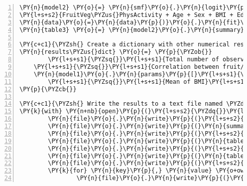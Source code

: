 \documentclass[11pt]{article}
\begin{document}
\begin{Verbatim}[commandchars=\\\{\},numbers=left,firstnumber=1,stepnumber=1,formatcom=\footnotesize]
\PY{n}{model2} \PY{o}{=} \PY{n}{smf}\PY{o}{.}\PY{n}{logit}\PY{p}{(}\PY{l+s+s2}{\PYZdq{}}\PY{l+s+s2}{Diabetes\PYZus{}binary \PYZti{} FruitVeg + PhysActivity + }\PY{l+s+se}{\PYZbs{}}
\PY{l+s+s2}{FruitVeg\PYZus{}PhysActivity + Age + Sex + BMI + Education + Income}\PY{l+s+s2}{\PYZdq{}}\PY{p}{,} \PYZbs{}
\PY{n}{data}\PY{o}{=}\PY{n}{data}\PY{p}{)}\PY{o}{.}\PY{n}{fit}\PY{p}{(}\PY{p}{)}
\PY{n}{table3} \PY{o}{=} \PY{n}{model2}\PY{o}{.}\PY{n}{summary}\PY{p}{(}\PY{p}{)}

\PY{c+c1}{\PYZsh{} Create a dictionary with other numerical results}
\PY{n}{results\PYZus{}dict} \PY{o}{=} \PY{p}{\PYZob{}}
        \PY{l+s+s1}{\PYZsq{}}\PY{l+s+s1}{Total number of observations}\PY{l+s+s1}{\PYZsq{}}\PY{p}{:} \PY{n+nb}{len}\PY{p}{(}\PY{n}{data}\PY{p}{)}\PY{p}{,}
    \PY{l+s+s1}{\PYZsq{}}\PY{l+s+s1}{Correlation between fruit/veg consumption and diabetes risk}\PY{l+s+s1}{\PYZsq{}}\PY{p}{:} \PYZbs{}
    \PY{n}{model1}\PY{o}{.}\PY{n}{params}\PY{p}{[}\PY{l+s+s1}{\PYZsq{}}\PY{l+s+s1}{FruitVeg}\PY{l+s+s1}{\PYZsq{}}\PY{p}{]}\PY{p}{,}
        \PY{l+s+s1}{\PYZsq{}}\PY{l+s+s1}{Mean of BMI}\PY{l+s+s1}{\PYZsq{}}\PY{p}{:} \PY{n}{data}\PY{p}{[}\PY{l+s+s1}{\PYZsq{}}\PY{l+s+s1}{BMI}\PY{l+s+s1}{\PYZsq{}}\PY{p}{]}\PY{o}{.}\PY{n}{mean}\PY{p}{(}\PY{p}{)}\PY{p}{,}
\PY{p}{\PYZcb{}}

\PY{c+c1}{\PYZsh{} Write the results to a text file named \PYZdq{}results.txt\PYZdq{}}
\PY{k}{with} \PY{n+nb}{open}\PY{p}{(}\PY{l+s+s2}{\PYZdq{}}\PY{l+s+s2}{results.txt}\PY{l+s+s2}{\PYZdq{}}\PY{p}{,} \PY{l+s+s2}{\PYZdq{}}\PY{l+s+s2}{w}\PY{l+s+s2}{\PYZdq{}}\PY{p}{)} \PY{k}{as} \PY{n}{file}\PY{p}{:}
        \PY{n}{file}\PY{o}{.}\PY{n}{write}\PY{p}{(}\PY{l+s+s2}{\PYZdq{}}\PY{l+s+s2}{Results for Table 1:}\PY{l+s+se}{\PYZbs{}n}\PY{l+s+s2}{\PYZdq{}}\PY{p}{)}
        \PY{n}{file}\PY{o}{.}\PY{n}{write}\PY{p}{(}\PY{n}{summary\PYZus{}table}\PY{o}{.}\PY{n}{to\PYZus{}string}\PY{p}{(}\PY{p}{)}\PY{p}{)}
        \PY{n}{file}\PY{o}{.}\PY{n}{write}\PY{p}{(}\PY{l+s+s2}{\PYZdq{}}\PY{l+s+se}{\PYZbs{}n}\PY{l+s+se}{\PYZbs{}n}\PY{l+s+s2}{Results for Table 2:}\PY{l+s+se}{\PYZbs{}n}\PY{l+s+s2}{\PYZdq{}}\PY{p}{)}
        \PY{n}{file}\PY{o}{.}\PY{n}{write}\PY{p}{(}\PY{n}{table2}\PY{o}{.}\PY{n}{as\PYZus{}text}\PY{p}{(}\PY{p}{)}\PY{p}{)}
        \PY{n}{file}\PY{o}{.}\PY{n}{write}\PY{p}{(}\PY{l+s+s2}{\PYZdq{}}\PY{l+s+se}{\PYZbs{}n}\PY{l+s+se}{\PYZbs{}n}\PY{l+s+s2}{Results for Table 3:}\PY{l+s+se}{\PYZbs{}n}\PY{l+s+s2}{\PYZdq{}}\PY{p}{)}
        \PY{n}{file}\PY{o}{.}\PY{n}{write}\PY{p}{(}\PY{n}{table3}\PY{o}{.}\PY{n}{as\PYZus{}text}\PY{p}{(}\PY{p}{)}\PY{p}{)}
        \PY{n}{file}\PY{o}{.}\PY{n}{write}\PY{p}{(}\PY{l+s+s2}{\PYZdq{}}\PY{l+s+se}{\PYZbs{}n}\PY{l+s+se}{\PYZbs{}n}\PY{l+s+s2}{Other numerical results:}\PY{l+s+se}{\PYZbs{}n}\PY{l+s+s2}{\PYZdq{}}\PY{p}{)}
        \PY{k}{for} \PY{n}{key}\PY{p}{,} \PY{n}{value} \PY{o+ow}{in} \PY{n}{results\PYZus{}dict}\PY{o}{.}\PY{n}{items}\PY{p}{(}\PY{p}{)}\PY{p}{:}
                \PY{n}{file}\PY{o}{.}\PY{n}{write}\PY{p}{(}\PY{l+s+sa}{f}\PY{l+s+s2}{\PYZdq{}}\PY{l+s+si}{\PYZob{}}\PY{n}{key}\PY{l+s+si}{\PYZcb{}}\PY{l+s+s2}{: }\PY{l+s+si}{\PYZob{}}\PY{n}{value}\PY{l+s+si}{\PYZcb{}}\PY{l+s+se}{\PYZbs{}n}\PY{l+s+s2}{\PYZdq{}}\PY{p}{)}
\end{Verbatim}
\end{document}
